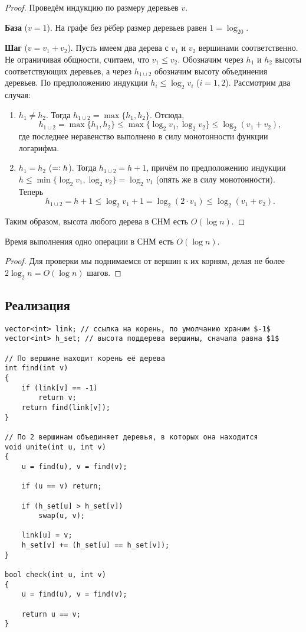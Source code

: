 \begin{proof}
    Проведём индукцию по размеру деревьев $v$.
    
    \textbf{База} ($v = 1$). На графе без рёбер размер деревьев равен $1 = \log_20$.

    \textbf{Шаг} ($v = v_1 + v_2$). Пусть имеем два дерева с $v_1$ и $v_2$ вершинами соответственно. Не ограничивая общности, считаем, что $v_1 \leqslant v_2$. Обозначим через $h_1$ и $h_2$ высоты соответствующих деревьев, а через $h_{1 \cup 2}$ обозначим высоту объединения деревьев. По предположению индукции $h_i \leqslant \log_2v_i$ ($i = 1, 2$). Рассмотрим два случая:
    \begin{enumerate}[nolistsep]
        \item $h_1 \ne h_2$. Тогда $h_{1 \cup 2} = \max\{h_1, h_2\}$. Отсюда,
        \[
            h_{1 \cup 2} = \max\{h_1, h_2\} \leqslant \max\{\log_2v_1, \log_2v_2\} \leqslant \log_2(v_1 + v_2),
        \]
        где последнее неравенство выполнено в силу монотонности функции логарифма.
        \item $h_1 = h_2$ ($= \vcentcolon h$). Тогда $h_{1 \cup 2} = h + 1$, причём по предположению индукции $h \leqslant \min\{\log_2v_1, \log_2v_2\} = \log_2v_1$ (опять же в силу монотонности). Теперь
        \[
            h_{1 \cup 2} = h + 1 \leqslant \log_2v_1 + 1 = \log_2(2 \cdot v_1) \leqslant \log_2(v_1 + v_2).
        \]
    \end{enumerate}
    Таким образом, высота любого дерева в СНМ есть $O(\log n)$.
\end{proof}

\begin{corollary}
    Время выполнения одно операции в СНМ есть $O(\log n)$.
\end{corollary}

\begin{proof}
    Для проверки мы поднимаемся от вершин к их корням, делая не более $2\log_2n = O(\log n)$ шагов.
\end{proof}

\subsection{Реализация}

\begin{verbatim}
vector<int> link; // ссылка на корень, по умолчанию храним $-1$
vector<int> h_set; // высота поддерева вершины, сначала равна $1$

// По вершине находит корень её дерева
int find(int v)
{
    if (link[v] == -1)
        return v;
    return find(link[v]);
}

// По 2 вершинам объединяет деревья, в которых она находится
void unite(int u, int v)
{
    u = find(u), v = find(v);

    if (u == v) return;

    if (h_set[u] > h_set[v])
        swap(u, v);

    link[u] = v;
    h_set[v] += (h_set[u] == h_set[v]);
}

bool check(int u, int v)
{
    u = find(u), v = find(v);

    return u == v;
}
\end{verbatim}

